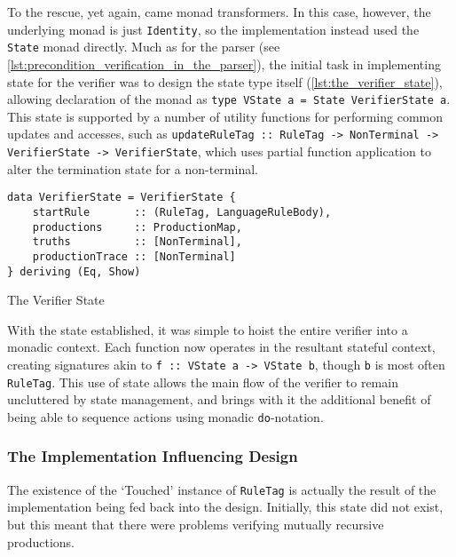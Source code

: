 To the rescue, yet again, came monad transformers. 
In this case, however, the underlying monad is just \texttt{Identity}, so the implementation instead used the \texttt{State} monad directly.
Much as for the parser (see \autoref{lst:precondition_verification_in_the_parser}), the initial task in implementing state for the verifier was to design the state type itself (\autoref{lst:the_verifier_state}), allowing declaration of the monad as \texttt{type VState a = State VerifierState a}.
This state is supported by a number of utility functions for performing common updates and accesses, such as \texttt{updateRuleTag :: RuleTag -> NonTerminal -> VerifierState -> VerifierState}, which uses partial function application to alter the termination state for a non-terminal. 

\begin{listing}[!htb]
\begin{verbatim}
data VerifierState = VerifierState {
    startRule       :: (RuleTag, LanguageRuleBody),
    productions     :: ProductionMap,
    truths          :: [NonTerminal],
    productionTrace :: [NonTerminal]
} deriving (Eq, Show)
\end{verbatim}
\caption{The Verifier State}
\label{lst:the_verifier_state}
\end{listing}

With the state established, it was simple to hoist the entire verifier into a monadic context. 
Each function now operates in the resultant stateful context, creating signatures akin to \texttt{f :: VState a -> VState b}, though \texttt{b} is most often \texttt{RuleTag}.
This use of state allows the main flow of the verifier to remain uncluttered by state management, and brings with it the additional benefit of being able to sequence actions using monadic \texttt{do}-notation. 


\subsubsection{The Implementation Influencing Design} %
\label{ssub:the_implementation_influencing_design}
The existence of the `Touched' instance of \texttt{RuleTag} is actually the result of the implementation being fed back into the design. 
Initially, this state did not exist, but this meant that there were problems verifying mutually recursive productions. \\

